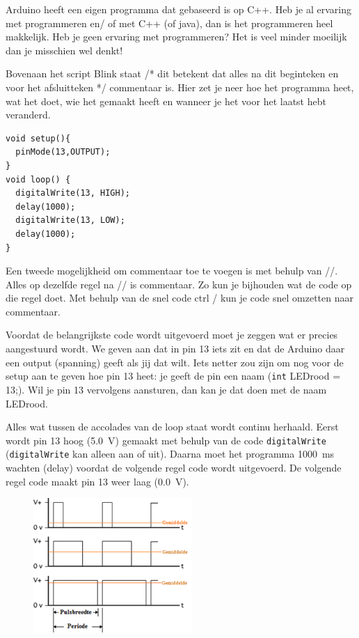 \documentclass{arduino}
\begin{document}
Arduino heeft een eigen programma dat gebaseerd is op C++. Heb je al ervaring met programmeren en/ of met C++ (of java), dan is het programmeren heel makkelijk. Heb je geen ervaring met programmeren? Het is veel minder moeilijk dan je misschien wel denkt!

Bovenaan het script Blink staat /* dit betekent dat alles na dit beginteken en voor het afsluitteken */ commentaar is. Hier zet je neer hoe het programma heet, wat het doet, wie het gemaakt heeft en wanneer je het voor het laatst hebt veranderd.

\begin{lstlisting}
void setup(){
  pinMode(13,OUTPUT);
}
void loop() {
  digitalWrite(13, HIGH);
  delay(1000);
  digitalWrite(13, LOW);
  delay(1000);
}
\end{lstlisting}

Een tweede mogelijkheid om commentaar toe te voegen is met behulp van //. Alles op dezelfde regel na // is commentaar. Zo kun je bijhouden wat de code op die regel doet. Met behulp van de snel code ctrl / kun je code snel omzetten naar commentaar.

Voordat de belangrijkste code wordt uitgevoerd moet je zeggen wat er precies aangestuurd wordt. We geven aan dat in pin 13 iets zit en dat de Arduino daar een output (spanning) geeft als jij dat wilt. Iets netter zou zijn om nog voor de setup aan te geven hoe pin 13 heet: je geeft de pin een naam (\lstinline{int} LEDrood = 13;). Wil je pin 13 vervolgens aansturen, dan kan je dat doen met de naam LEDrood.

Alles wat tussen de accolades {} van de loop staat wordt continu herhaald. Eerst wordt pin 13 hoog (\SI{5.0}{\volt}) gemaakt met behulp van de code \lstinline{digitalWrite} (\lstinline{digitalWrite} kan alleen aan of uit). Daarna moet het programma \SI{1000}{\milli\s} wachten (delay) voordat de volgende regel code wordt uitgevoerd. De volgende regel code maakt pin 13 weer laag (\SI{0.0}{\volt}).

\begin{figure}
\raggedleft
\includegraphics[width=6cm]{13. PWM}
\end{figure}
\end{document}
